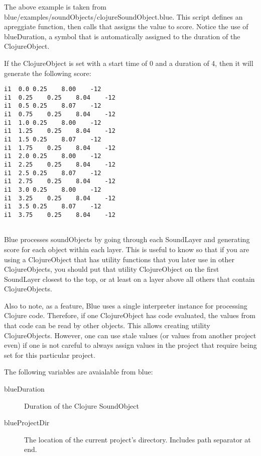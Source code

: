 The above example is taken from
blue/examples/soundObjects/clojureSoundObject.blue. This script defines
an apreggiate function, then calls that assigns the value to score.
Notice the use of blueDuration, a symbol that is automatically assigned
to the duration of the ClojureObject.

If the ClojureObject is set with a start time of 0 and a duration of 4,
then it will generate the following score:

\begin{verbatim}
i1  0.0 0.25    8.00    -12
i1  0.25    0.25    8.04    -12
i1  0.5 0.25    8.07    -12
i1  0.75    0.25    8.04    -12
i1  1.0 0.25    8.00    -12
i1  1.25    0.25    8.04    -12
i1  1.5 0.25    8.07    -12
i1  1.75    0.25    8.04    -12
i1  2.0 0.25    8.00    -12
i1  2.25    0.25    8.04    -12
i1  2.5 0.25    8.07    -12
i1  2.75    0.25    8.04    -12
i1  3.0 0.25    8.00    -12
i1  3.25    0.25    8.04    -12
i1  3.5 0.25    8.07    -12
i1  3.75    0.25    8.04    -12
    
\end{verbatim}

Blue processes soundObjects by going through each SoundLayer and
generating score for each object within each layer. This is useful to
know so that if you are using a ClojureObject that has utility functions
that you later use in other ClojureObjects, you should put that utility
ClojureObject on the first SoundLayer closest to the top, or at least on
a layer above all others that contain ClojureObjects.

Also to note, as a feature, Blue uses a single interpreter instance for
processing Clojure code. Therefore, if one ClojureObject has code
evaluated, the values from that code can be read by other objects. This
allows creating utility ClojureObjects. However, one can use stale
values (or values from another project even) if one is not careful to
always assign values in the project that require being set for this
particular project.

The following variables are avaialable from blue:

\begin{description}
\item[blueDuration]
Duration of the Clojure SoundObject
\item[blueProjectDir]
The location of the current project's directory. Includes path separator
at end.
\end{description}

